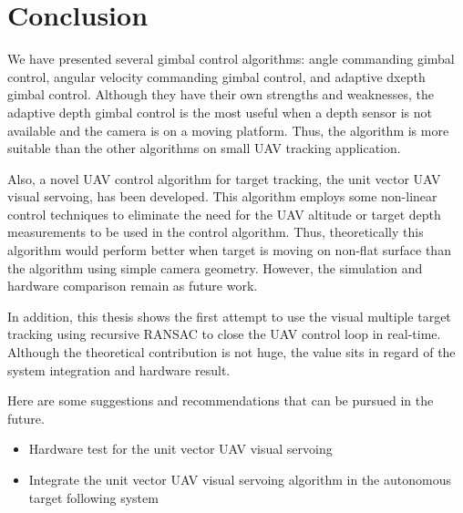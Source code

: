 \chapter{Conclusion}
\label{chapter5}
We have presented several gimbal control algorithms: angle commanding gimbal control, angular velocity commanding gimbal control, and adaptive dxepth gimbal control. Although they have their own strengths and weaknesses, the adaptive depth gimbal control is the most useful when a depth sensor is not available and the camera is on a moving platform. Thus, the algorithm is more suitable than the other algorithms on small UAV tracking application. 

Also, a novel UAV control algorithm for target tracking, the unit vector UAV visual servoing, has been developed. This algorithm employs some non-linear control techniques to eliminate the need for the UAV altitude or target depth measurements to be used in the control algorithm. Thus, theoretically this algorithm would perform better when target is moving on non-flat surface than the algorithm using simple camera geometry. However, the simulation and hardware comparison remain as future work.

In addition, this thesis shows the first attempt to use the visual multiple target tracking using recursive RANSAC to close the UAV control loop in real-time. Although the theoretical contribution is not huge, the value sits in regard of the system integration and hardware result. 

Here are some suggestions and recommendations that can be pursued in the future.
\begin{itemize}
	\item Hardware test for the unit vector UAV visual servoing
	\item Integrate the unit vector UAV visual servoing algorithm in the autonomous target following system
\end{itemize}
